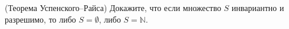 (Теорема Успенского--Райса) Докажите, что если множество $S$ инвариантно и разрешимо, то либо
$S = \emptyset$, либо $S = \mathbb{N}$.
